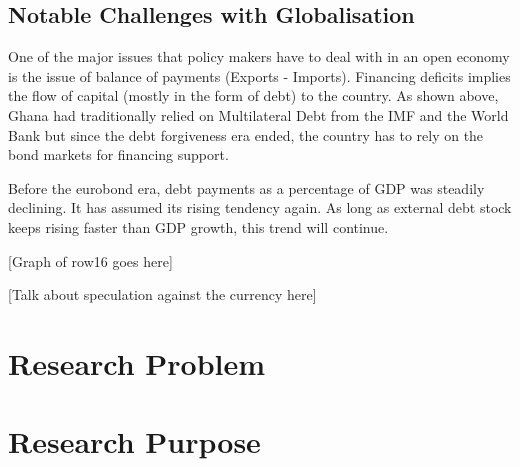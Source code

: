 \documentclass[a4paper, 12pt]{article}
\begin{document}
	\subsection{Notable Challenges with Globalisation}
	
	One of the major issues that policy makers have to deal with in an open economy is the issue of balance of payments (Exports - Imports). Financing deficits implies the flow of capital (mostly in the form of debt) to the country. As shown above, Ghana had traditionally relied on Multilateral Debt from the IMF and the World Bank but since the debt forgiveness era ended, the country has to rely on the bond markets for financing support.
	
	Before the eurobond era, debt payments as a percentage of GDP
	was steadily declining. It has assumed its rising tendency again. As
	long as external debt stock keeps rising faster than GDP growth,
	this trend will continue.
	
	[Graph of row16 goes here] 
	
	[Talk about speculation against the currency here]
	\section{Research Problem}
	\section{Research Purpose}
	\newpage
	\singlespacing
		
	
\end{document}
